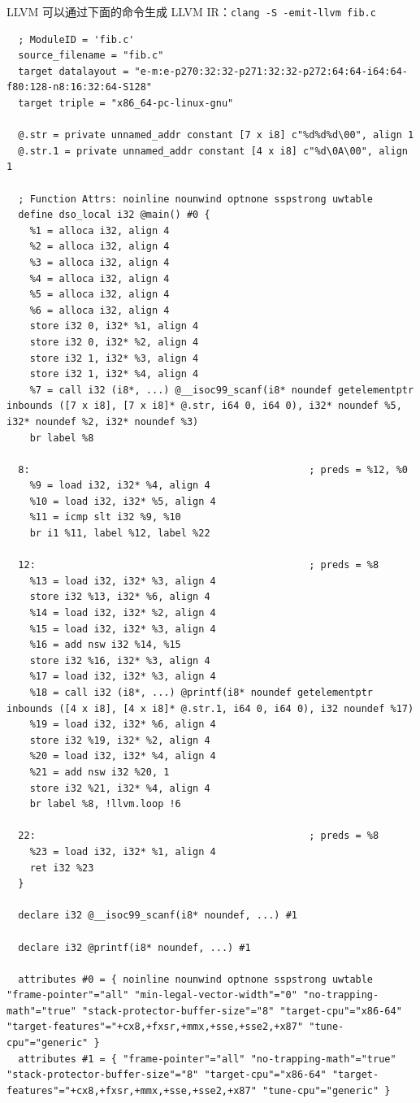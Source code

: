 \documentclass[UTF8,a4paper,10pt]{ctexart}
\begin{document}
LLVM 可以通过下面的命令生成 LLVM IR：\verb|clang -S -emit-llvm fib.c|
\begin{verbatim}
  ; ModuleID = 'fib.c'
  source_filename = "fib.c"
  target datalayout = "e-m:e-p270:32:32-p271:32:32-p272:64:64-i64:64-f80:128-n8:16:32:64-S128"
  target triple = "x86_64-pc-linux-gnu"
  
  @.str = private unnamed_addr constant [7 x i8] c"%d%d%d\00", align 1
  @.str.1 = private unnamed_addr constant [4 x i8] c"%d\0A\00", align 1
  
  ; Function Attrs: noinline nounwind optnone sspstrong uwtable
  define dso_local i32 @main() #0 {
    %1 = alloca i32, align 4
    %2 = alloca i32, align 4
    %3 = alloca i32, align 4
    %4 = alloca i32, align 4
    %5 = alloca i32, align 4
    %6 = alloca i32, align 4
    store i32 0, i32* %1, align 4
    store i32 0, i32* %2, align 4
    store i32 1, i32* %3, align 4
    store i32 1, i32* %4, align 4
    %7 = call i32 (i8*, ...) @__isoc99_scanf(i8* noundef getelementptr inbounds ([7 x i8], [7 x i8]* @.str, i64 0, i64 0), i32* noundef %5, i32* noundef %2, i32* noundef %3)
    br label %8
  
  8:                                                ; preds = %12, %0
    %9 = load i32, i32* %4, align 4
    %10 = load i32, i32* %5, align 4
    %11 = icmp slt i32 %9, %10
    br i1 %11, label %12, label %22
  
  12:                                               ; preds = %8
    %13 = load i32, i32* %3, align 4
    store i32 %13, i32* %6, align 4
    %14 = load i32, i32* %2, align 4
    %15 = load i32, i32* %3, align 4
    %16 = add nsw i32 %14, %15
    store i32 %16, i32* %3, align 4
    %17 = load i32, i32* %3, align 4
    %18 = call i32 (i8*, ...) @printf(i8* noundef getelementptr inbounds ([4 x i8], [4 x i8]* @.str.1, i64 0, i64 0), i32 noundef %17)
    %19 = load i32, i32* %6, align 4
    store i32 %19, i32* %2, align 4
    %20 = load i32, i32* %4, align 4
    %21 = add nsw i32 %20, 1
    store i32 %21, i32* %4, align 4
    br label %8, !llvm.loop !6
  
  22:                                               ; preds = %8
    %23 = load i32, i32* %1, align 4
    ret i32 %23
  }
  
  declare i32 @__isoc99_scanf(i8* noundef, ...) #1
  
  declare i32 @printf(i8* noundef, ...) #1
  
  attributes #0 = { noinline nounwind optnone sspstrong uwtable "frame-pointer"="all" "min-legal-vector-width"="0" "no-trapping-math"="true" "stack-protector-buffer-size"="8" "target-cpu"="x86-64" "target-features"="+cx8,+fxsr,+mmx,+sse,+sse2,+x87" "tune-cpu"="generic" }
  attributes #1 = { "frame-pointer"="all" "no-trapping-math"="true" "stack-protector-buffer-size"="8" "target-cpu"="x86-64" "target-features"="+cx8,+fxsr,+mmx,+sse,+sse2,+x87" "tune-cpu"="generic" }
  

\end{verbatim}
\end{document}
